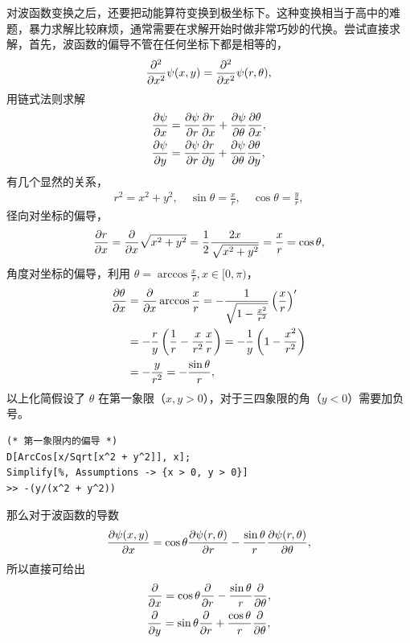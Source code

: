 对波函数变换之后，还要把动能算符变换到极坐标下。这种变换相当于高中的难题，暴力求解比较麻烦，通常需要在求解开始时做非常巧妙的代换。尝试直接求解，首先，波函数的偏导不管在任何坐标下都是相等的，
\begin{align}
    \pdv[2]x \psi(x,y) = \pdv[2]{x} \psi(r,\theta),
\end{align}
用链式法则求解
\begin{align}
    &\pdv{\psi}{x} = \pdv{\psi}{r} \pdv{r}{x} + \pdv{\psi}{\theta} \pdv{\theta}{x},\\
    &\pdv{\psi}{y} = \pdv{\psi}{r} \pdv{r}{y} + \pdv{\psi}{\theta} \pdv{\theta}{y},
\end{align}
有几个显然的关系，
\begin{align}
    r^2 = x^2 + y^2, \quad \sin \theta = \frac xr,\quad \cos\theta = \frac yr,
\end{align}
径向对坐标的偏导，
\begin{align}
    \pdv{r}{x} = \pdv{x} \sqrt{x^2 + y^2} = \frac 12 \frac{2x}{\sqrt{x^2 + y^2}} = \frac xr = \cos\theta,
\end{align}
角度对坐标的偏导，利用 $\theta = \arccos \frac xr, x\in[0,\pi)$，
\begin{align}
    \pdv{\theta}{x} &= \pdv{x} \arccos \frac xr = -\frac1{\sqrt{1- \frac{x^2}{r^2}}} \left(\frac xr\right)^{\prime} \\
    &= -\frac ry \left(\frac 1r - \frac x{r^2} \frac xr\right) 
    = -\frac 1y \left(1 - \frac{x^2}{r^2}\right) \\
    &= -\frac{y}{r^2} = - \frac{\sin\theta} r, 
\end{align}
以上化简假设了 $\theta$ 在第一象限（$x,y>0$），对于三四象限的角（$y < 0$）需要加负号。
\begin{lstlisting}
(* 第一象限内的偏导 *)
D[ArcCos[x/Sqrt[x^2 + y^2]], x];
Simplify[%, Assumptions -> {x > 0, y > 0}]
>> -(y/(x^2 + y^2))
\end{lstlisting}

那么对于波函数的导数
\begin{align}
    \pdv{\psi(x,y)}{x} = \cos\theta \pdv{\psi(r,\theta)}{r} - \frac{\sin\theta} r \pdv{\psi(r,\theta)}{\theta}, 
\end{align}
所以直接可给出
\begin{align}
    & \pdv{x} = \cos\theta \pdv{r} - \frac{\sin\theta}r \pdv{\theta},\\
    & \pdv{y} = \sin\theta \pdv{r} + \frac{\cos\theta}{r} \pdv{\theta},
\end{align}

